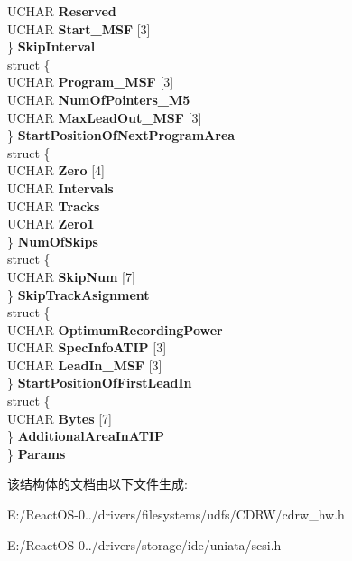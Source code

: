 \begin{DoxyCompactItemize}
\begin{tabbing}
\>\>UCHAR {\bfseries Reserved}\\
\>\>UCHAR {\bfseries Start\_MSF} \mbox{[}3\mbox{]}\\
\>\} {\bfseries SkipInterval}\\
\>struct \{\\
\>\>UCHAR {\bfseries Program\_MSF} \mbox{[}3\mbox{]}\\
\>\>UCHAR {\bfseries NumOfPointers\_M5}\\
\>\>UCHAR {\bfseries MaxLeadOut\_MSF} \mbox{[}3\mbox{]}\\
\>\} {\bfseries StartPositionOfNextProgramArea}\\
\>struct \{\\
\>\>UCHAR {\bfseries Zero} \mbox{[}4\mbox{]}\\
\>\>UCHAR {\bfseries Intervals}\\
\>\>UCHAR {\bfseries Tracks}\\
\>\>UCHAR {\bfseries Zero1}\\
\>\} {\bfseries NumOfSkips}\\
\>struct \{\\
\>\>UCHAR {\bfseries SkipNum} \mbox{[}7\mbox{]}\\
\>\} {\bfseries SkipTrackAsignment}\\
\>struct \{\\
\>\>UCHAR {\bfseries OptimumRecordingPower}\\
\>\>UCHAR {\bfseries SpecInfoATIP} \mbox{[}3\mbox{]}\\
\>\>UCHAR {\bfseries LeadIn\_MSF} \mbox{[}3\mbox{]}\\
\>\} {\bfseries StartPositionOfFirstLeadIn}\\
\>struct \{\\
\>\>UCHAR {\bfseries Bytes} \mbox{[}7\mbox{]}\\
\>\} {\bfseries AdditionalAreaInATIP}\\
\} {\bfseries Params}\\

\end{tabbing}\end{DoxyCompactItemize}


该结构体的文档由以下文件生成\+:\begin{DoxyCompactItemize}
\item 
E\+:/\+React\+O\+S-\/0../drivers/filesystems/udfs/\+C\+D\+R\+W/cdrw\+\_\+hw.\+h\item 
E\+:/\+React\+O\+S-\/0../drivers/storage/ide/uniata/scsi.\+h\end{DoxyCompactItemize}
